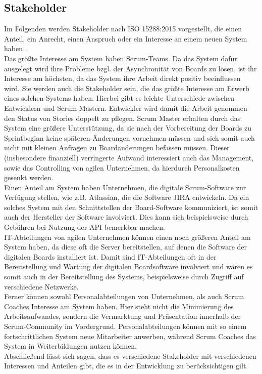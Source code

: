 \documentclass[12pt,titlepage]{scrartcl}
\begin{document}
		\subsection{Stakeholder}
		Im Folgenden werden Stakeholder nach ISO 15288:2015 vorgestellt, die einen Anteil, ein Anrecht, einen Anspruch oder ein Interesse an einem neuen System haben \cite{ISO15288}.  \\
		Das größte Interesse am System haben Scrum-Teams. Da das System dafür ausgelegt wird ihre Probleme bzgl. der Asynchronität von Boards zu lösen, ist ihr Interesse am höchsten, da das System ihre Arbeit direkt positiv beeinflussen wird. Sie werden auch die Stakeholder sein, die das größte Interesse am Erwerb eines solchen Systems haben. Hierbei gibt es leichte Unterschiede zwischen Entwicklern und Scrum Mastern. Entwickler wird damit die Arbeit genommen den Status von Stories doppelt zu pflegen. Scrum Master erhalten durch das System eine größere Unterstützung, da sie nach der Vorbereitung der Boards zu Sprintbeginn keine späteren Änderungen vornehmen müssen und sich somit auch nicht mit kleinen Anfragen zu Boardänderungen befassen müssen. Dieser (insbesondere finanziell) verringerte Aufwand interessiert auch das Management, sowie das Controlling von agilen Unternehmen, da hierdurch Personalkosten gesenkt werden. \\
		Einen Anteil am System haben Unternehmen, die digitale Scrum-Software zur Verfügung stellen, wie z.B. Atlassian, die die Software JIRA entwickeln. Da ein solches System mit den Schnittstellen der Board-Software kommuniziert, ist somit auch der Hersteller der Software involviert. Dies kann sich beispielsweise durch Gebühren bei Nutzung der API bemerkbar machen. \\
		IT-Abteilungen von agilen Unternehmen können einen noch größeren Anteil am System haben, da diese oft die Server bereitstellen, auf denen die Software der digitalen Boards installiert ist. Damit sind IT-Abteilungen oft in der Bereitstellung und Wartung der digitalen Boardsoftware involviert und wären es somit auch in der Bereitstellung des Systems, beispielsweise durch Zugriff auf verschiedene Netzwerke. \\
		Ferner können sowohl Personalabteilungen von Unternehmen, als auch Scrum Coaches Interesse am System haben. Hier steht nicht die Minimierung des Arbeitsaufwandes, sondern die Vermarktung und Präsentation innerhalb der Scrum-Community im Vordergrund. Personalabteilungen können mit so einem fortschrittlichen System neue Mitarbeiter anwerben, während Scrum Coaches das System in Weiterbildungen nutzen können. \\
		Abschließend lässt sich sagen, dass es verschiedene Stakeholder mit verschiedenen Interessen und Anteilen gibt, die es in der Entwicklung zu berücksichtigen gilt.
\end{document}
